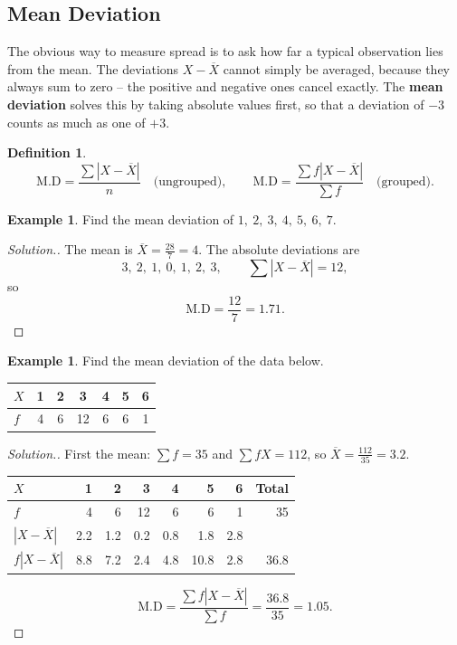 \documentclass[11pt,a4paper]{article}
\theoremstyle{definition}
\newtheorem{definition}[thm]{Definition}
\newtheorem{example}[thm]{Example}
\newenvironment{solution}
  {\renewcommand{\qedsymbol}{}\begin{proof}[\textit{Solution}.]}
  {\end{proof}}
\begin{document}
\vspace{0.5cm}

\subsection{Mean Deviation}

The obvious way to measure spread is to ask how far a typical observation lies from the
mean. The deviations $X-\overline{X}$ cannot simply be averaged, because they always sum to
zero -- the positive and negative ones cancel exactly. The \textbf{mean deviation} solves
this by taking absolute values first, so that a deviation of $-3$ counts as much as one of
$+3$.

\begin{definition}
\[\text{M.D}=\frac{\sum |X-\overline{X}|}{n}\quad\text{(ungrouped)},
\qquad
\text{M.D}=\frac{\sum f|X-\overline{X}|}{\sum f}\quad\text{(grouped)}.\]
\end{definition}

\begin{example}
Find the mean deviation of $1,\ 2,\ 3,\ 4,\ 5,\ 6,\ 7$.
\end{example}

\begin{solution}
The mean is $\overline{X}=\frac{28}{7}=4$. The absolute deviations are
\[3,\ 2,\ 1,\ 0,\ 1,\ 2,\ 3,\qquad \sum|X-\overline{X}|=12,\]
so
\[\text{M.D}=\frac{12}{7}=1.71.\]
\end{solution}

\begin{example}
Find the mean deviation of the data below.
\begin{table}[H]
\centering
\begin{tabular}{lcccccc}
$X$ & 1 & 2 & 3 & 4 & 5 & 6\\
\hline
$f$ & 4 & 6 & 12 & 6 & 6 & 1\\
\end{tabular}
\end{table}
\end{example}

\begin{solution}
First the mean: $\sum f=35$ and $\sum fX=112$, so $\overline{X}=\frac{112}{35}=3.2$.
\begin{table}[H]
\centering
\begin{tabular}{lrrrrrrr}
$X$ & 1 & 2 & 3 & 4 & 5 & 6 & Total\\
\hline
$f$ & 4 & 6 & 12 & 6 & 6 & 1 & 35\\
$|X-\overline{X}|$ & 2.2 & 1.2 & 0.2 & 0.8 & 1.8 & 2.8 & \\
$f|X-\overline{X}|$ & 8.8 & 7.2 & 2.4 & 4.8 & 10.8 & 2.8 & 36.8\\
\end{tabular}
\end{table}
\[\text{M.D}=\frac{\sum f|X-\overline{X}|}{\sum f}=\frac{36.8}{35}=1.05.\]
\end{solution}
\end{document}
